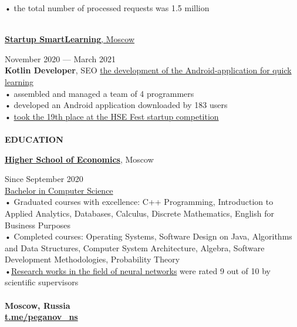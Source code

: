 \documentclass{article}
\begin{document}
\begin{vwcol}[widths={0.8,0.2},
 sep=.8cm, justify=flush,rule=0pt,indent=1em]
• the total number of processed requests was 1.5 million\\
\\
\begin{Large}
\href{https://www.canva.com/design/DAEaT9nPC7Y/y7_r2BzUEiUiFKW36oP-Pw/view?utm_content=DAEaT9nPC7Y&utm_campaign=designshare&utm_medium=link&utm_source=publishsharelink}{\textbf{Startup SmartLearning}, Moscow}
\end{Large}
\hspace{70pt}November 2020 — March 2021\\
\textbf{Kotlin Developer}, SEO \href{https://gitlab.com/peganov.nik/smartlearning}{the development of the Android-application for quick learning}\\
• assembled and managed a team of 4 programmers\\
• developed an Android application downloaded by 183 users\\
• \href{https://fest.hse.ru/top1002021}{took the 19th place at the HSE Fest startup competition}\\
\\
\noindent\textcolor[rgb]{0.1255,0.2902,0.7843}{\textbf{\Large{EDUCATION}}}\\
\begin{Large}
\textbf{\href{https://hse.ru/}{Higher School of Economics}}, Moscow
\end{Large}
\hspace{75pt}Since September 2020\\
\href{https://cs.hse.ru/}{Bachelor in Computer Science}\\
• Graduated courses with excellence: C++ Programming, Introduction to Applied Analytics, Databases, Calculus, Discrete Mathematics, English for Business Purposes\\
• Completed courses: Operating Systems, Software Design on Java, Algorithms and Data Structures, Computer System Architecture, Algebra, Software Development Methodologies, Probability Theory\\
•\href{https://github.com/NikPeg/synchronization-of-neuromorphic-networks-of-the-close-world-from-the-point-of-view-of-complexes} {Research works in the field of neural networks} were rated 9 out of 10 by scientific supervisors\\
\newpage
~\\
\noindent\textbf{Moscow, Russia}\\
\noindent\textbf{\textcolor[rgb]{0.1255,0.2902,0.7843}{\href{https://t.me/peganov\_ns}{t.me/peganov\_ns}}}\\

\end{vwcol}
\end{document}
